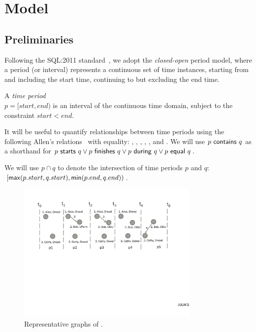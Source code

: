 \section{Model}
\label{sec:model}

\subsection{Preliminaries}
\label{sec:model:prelim}

Following the SQL:2011
standard~\cite{DBLP:journals/sigmod/KulkarniM12}, we adopt the {\em
  closed-open} period model, where a period (or interval) represents a
continuous set of time instances, starting from and including the
start time, continuing to but excluding the end time.

\begin{definition}
A {\em time period} \\$p = [start, end)$ is an interval of the
  continuous time domain, subject to the constraint $start < end$.
\label{def:period} 
\end{definition}

It will be useful to quantify relationships between time periods using
the following Allen's relations~\cite{allen83} with equality:
, , ,
, , and .  We
will use $p~\mathsf{contains}~q$ as a shorthand for
$p~\mathsf{starts}~q \vee p~\mathsf{finishes}~q \vee
p~\mathsf{during}~q \vee p~\mathsf{equal}~q$.

We will use $p \cap q$ to denote the intersection of time periods $p$
and $q$: $[\mathsf{max}(p.start,q.start), \mathsf{min}(p.end,
  q.end))$.

\begin{figure}
\centering
\includegraphics[width=3.5in]{figs/T1_graphs.pdf}
\caption{Representative graphs of \tg {}.}
\label{fig:tg_rg}
\end{figure}

